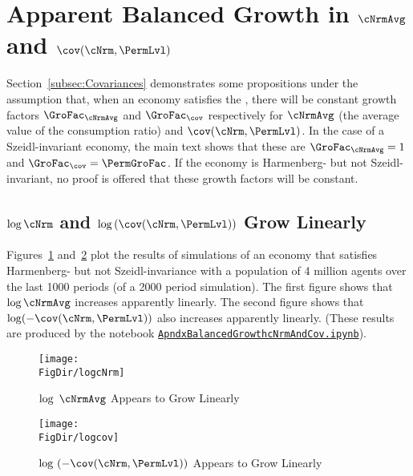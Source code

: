 \documentclass[\econtexRoot/BufferStockTheory]{subfiles}
\begin{document}
\hypertarget{ApndxBalancedGrowthcNrmAndCov}{}
\section{Apparent Balanced Growth in \texorpdfstring{$\cNrmAvg$}{c} and \texorpdfstring{$\cov(\cNrm,\PermLvl)$}{cov(c,p)}}\label{sec:ApndxBalancedGrowthcNrmAndCov}


Section~\ref{subsec:Covariances} demonstrates some propositions under the assumption that, when an economy satisfies the {\GICRaw}, there will be constant growth factors $\GroFac_{\cNrmAvg}$ and $\GroFac_{\cov}$ respectively for $\cNrmAvg$ (the average value of the consumption ratio) and $\cov(\cNrm,\PermLvl)$.  In the case of a Szeidl-invariant economy, the main text shows that these are $\GroFac_{\cNrmAvg}=1$ and $\GroFac_{\cov}=\PermGroFac$.  If the economy is Harmenberg- but not Szeidl-invariant, no proof is offered that these growth factors will be constant.

\subsection{\texorpdfstring{$\log \cNrm$}{log c} and \texorpdfstring{$\log \left(\cov(\cNrm,\PermLvl)\right)$}{log cov(c,p)} Grow Linearly}
Figures~\ref{fig:logcNrm} and~\ref{fig:logcov} plot the results of simulations of an economy that satisfies Harmenberg- but not Szeidl-invariance with a population of 4 million agents over the last 1000 periods (of a 2000 period simulation).  The first figure shows that $\log \cNrmAvg$ increases apparently linearly.  The second figure shows that $\log (-\cov(\cNrm,\PermLvl))$ also increases apparently linearly.  (These results are produced by the notebook \href{https://github.com/econ-ark/BufferStockTheory/blob/master/Code/Python/ApndxBalancedGrowthcNrmAndCov.ipynb}{\texttt{ApndxBalancedGrowthcNrmAndCov.ipynb}}).

\pagebreak
\begin{figure}[ht]
  \centerline{
    \texttt{[image: \\FigDir/logcNrm]}
  }
  \caption{$\log ~\cNrmAvg$ Appears to Grow Linearly}\label{fig:logcNrm}
\end{figure}
\begin{figure}[ht]
  \centerline{
    \texttt{[image: \\FigDir/logcov]}
  }
  \caption{$\log ~(-\cov(\cNrm,\PermLvl))$ Appears to Grow Linearly}\label{fig:logcov}
\end{figure}
\end{document}
